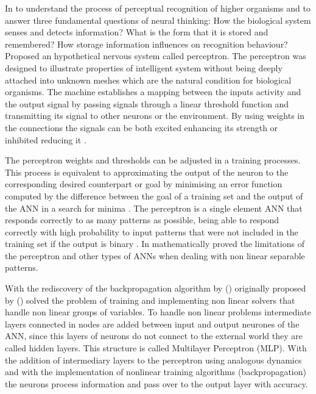 In \citeyear{rosenblatt1958perceptron} \citeauthor{rosenblatt1958perceptron} to understand the process of perceptual recognition of higher organisms and to answer three fundamental questions of neural thinking: How the biological system senses and detects information? What is the form that it is stored and remembered? How storage information influences on recognition behaviour? Proposed an hypothetical nervous system called perceptron. The perceptron was designed to illustrate properties of intelligent system without being deeply attached into unknown meshes which are the natural condition for biological organisms. The machine establishes a mapping between the inputs activity and the output signal by passing signals through a linear threshold function and transmitting its signal to other neurons or the environment. By using weights in the connections the signals can be both excited enhancing its strength or inhibited reducing it \cite{basheer2000artificial}. 

The perceptron weights and thresholds can be adjusted in a training processes. This process is equivalent to approximating the output of the neuron to the corresponding desired counterpart or goal by minimising an error function computed by the difference between the goal of a training set and the output of the ANN in a search for minima \cite{ramchoun2016multilayer}. The perceptron is a single element ANN that responds correctly to as many patterns as possible, being able to respond correctly with high probability to input patterns that were not included in the training set if the output is binary \cite{widrow199030}. In \citeyear{minsky1969perceptrons} \citeauthor{minsky1969perceptrons} mathematically proved the limitations of the perceptron and other types of ANNs when dealing with non linear separable patterns.  

 With the rediscovery of the backpropagation algorithm by \citeauthor{rumelhart1985learning} (\citeyear{rumelhart1985learning}) originally proposed by \citeauthor{Werbos:74} (\citeyear{Werbos:74}) solved the problem of training and implementing non linear solvers that handle non linear groups of variables. To handle non linear problems intermediate layers connected in nodes are added between input and output neurones of the ANN, since this layers of neurons do not connect to the external world they are called hidden layers. This structure is called Multilayer Perceptron (MLP). With the addition of intermediary layers to the perceptron using analogous dynamics and with the implementation of nonlinear training algorithms (backpropagation) the neurons process information and pass over to the output layer with accuracy. 

